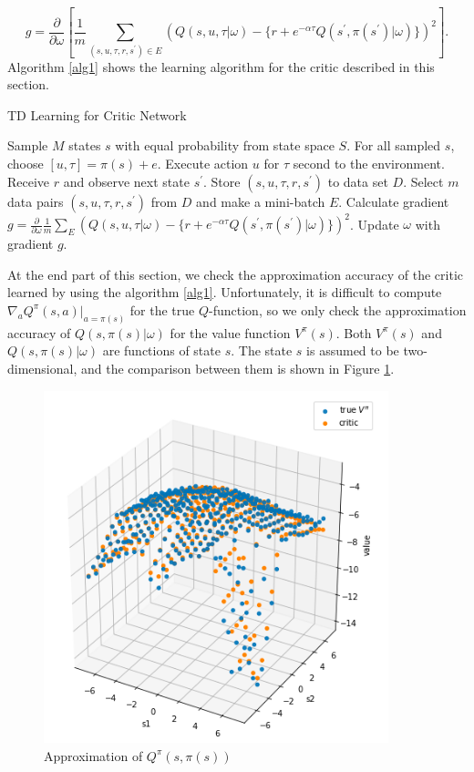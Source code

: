 \documentclass[english, dvipdfmx]{ampmt}             %
\newcommand{\pdif}[2]{\frac{\partial#1}{\partial#2}}
\begin{document}
\begin{equation}
	g = \pdif{}{\omega}\left[\frac{1}{m}\sum_{(s,u,\tau,r,s^{\prime})\in E}\left(Q(s,u,\tau|\omega) - \{r + e^{-\alpha\tau}Q(s^{\prime}, \pi(s^{\prime})|\omega)\}\right)^2\right].
\end{equation}
Algorithm \ref{alg1} shows the learning algorithm for the critic described in this section.
\begin{algorithm}                      
\caption{TD Learning for Critic Network}         
\label{alg1}                          
\begin{algorithmic}                  
    \STATE Sample $M$ states $s$ with equal probability from state space $S$.
    	\STATE For all sampled $s$, choose $[u, \tau]=\pi(s) + e$.
	\STATE Execute action $u$ for $\tau$ second to the environment.
	\STATE Receive $r$ and observe next state $s^{\prime}$.
	\STATE Store $(s, u, \tau, r, s^{\prime})$ to data set $D$.
    \ENDFOR
    	\STATE Select $m$ data pairs $(s, u, \tau, r, s^{\prime})$ from $D$ and make a mini-batch $E$.
	\STATE Calculate gradient $g = \pdif{}{\omega} \frac{1}{m}\sum_{E}\left(Q(s,u,\tau|\omega) - \{r + e^{-\alpha\tau}Q(s^{\prime}, \pi(s^{\prime})|\omega)\}\right)^2$.
	\STATE Update $\omega$ with gradient $g$.
    \ENDFOR
    \end{algorithmic}
\end{algorithm}\par
At the end part of this section, we check the approximation accuracy of the critic learned by using the algorithm \ref{alg1}. Unfortunately, it is difficult to compute $\nabla_aQ^{\pi}(s,a)|_{a=\pi(s)}$ for the true $Q$-function, so we only check the approximation accuracy of $Q(s,\pi(s)|\omega)$ for the value function $V^{\pi}(s)$. Both $V^{\pi}(s)$ and $Q(s, \pi(s)|\omega)$ are functions of state $s$. The state $s$ is assumed to be two-dimensional, and the comparison between them is shown in Figure \ref{Q_approximation}. 
\begin{figure}[H]
	\centering
 	\includegraphics[width=10cm]{Q_approximation.png}
 	\caption{Approximation of $Q^{\pi}(s,\pi(s))$} \label{Q_approximation}
\end{figure}
\end{document}
